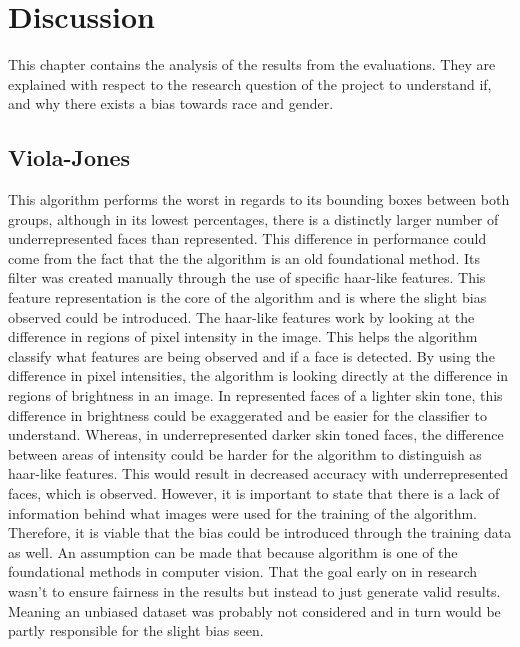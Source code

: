 \documentclass{l4proj}
\begin{document}
\chapter{Discussion}
This chapter contains the analysis of the results from the evaluations. They are explained with respect to the research question of the project to understand if, and why there exists a bias towards race and gender. 
\section{Viola-Jones}
This algorithm performs the worst in regards to its bounding boxes between both groups, although in its lowest percentages, there is a distinctly larger number of underrepresented faces than represented. This difference in performance could come from the fact that the the algorithm is an old foundational method. Its filter was created manually through the use of specific haar-like features. This feature representation is the core of the algorithm and is where the slight bias observed could be introduced. The haar-like features work by looking at the difference in regions of pixel intensity in the image. This helps the algorithm classify what features are being observed and if a face is detected. By using the difference in pixel intensities, the algorithm is looking directly at the difference in regions of brightness in an image. In represented faces of a lighter skin tone, this difference in brightness could be exaggerated and be easier for the classifier to understand. Whereas, in underrepresented darker skin toned faces, the difference between areas of intensity could be harder for the algorithm to distinguish as haar-like features. This would result in decreased accuracy with underrepresented faces, which is observed. However, it is important to state that there is a lack of information behind what images were used for the training of the algorithm. Therefore, it is viable that the bias could be introduced through the training data as well. An assumption can be made that because algorithm is one of the foundational methods in computer vision. That the goal early on in research wasn't to ensure fairness in the results but instead to just generate valid results. Meaning an unbiased dataset was probably not considered and in turn would be partly responsible for the slight bias seen.

\end{document}
